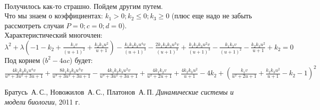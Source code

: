 \documentclass[oneside, final, 12pt]{article}
\begin{document}
\)\\

Получилось как-то страшно. Пойдем другим путем.\\

Что мы знаем о коэффициентах: \( k_1 > 0; k_2 \leq 0; k_3 \geq 0\) (плюс еще надо не забыть рассмотреть случаи \(P=0; c=0; d=0\)).\\

Характеристический многочлен:\\

\(
\lambda^{2}  + \lambda \left( -1 - k_{2} + \frac{k_{1}  v}{(u+1)^2} + \frac{k_{2} k_{3}  u^{2}}{u + 1} \right)  - \frac{k_{1} k_{2} k_{3} u^{4} v}{(u+1)^3} - \frac{2 k_{1} k_{2} k_{3} u^{3} v}{(u+1)^3} + \frac{k_{1} k_{2} k_{3} u^{2} v}{(u+1)^3} - \frac{k_{1} k_{2} v}{(u+1)^2}  - \frac{k_{2} k_{3} u^{2}}{u + 1} + k_{2} = 0
\)\\


Под корнем (\(b^2 - 4ac\)) будет:\\

\( \frac{4 k_{1} k_{2} k_{3} u^{4} v}{u^{3} + 3 u^{2} + 3 u + 1} + \frac{8 k_{1} k_{2} k_{3} u^{3} v}{u^{3} + 3 u^{2} + 3 u + 1} - \frac{4 k_{1} k_{2} k_{3} u^{2} v}{u^{3} + 3 u^{2} + 3 u + 1} + \frac{4 k_{1} k_{2} v}{u^{2} + 2 u + 1} + \frac{4 k_{2} k_{3} u^{2}}{u + 1} - 4 k_{2} + \left(\frac{k_{1} v}{u^{2} + 2 u + 1} + \frac{k_{2} k_{3} u^{2}}{u + 1} - k_{2} - 1\right)^{2}
\)\\



\newpage
\clearpage
\begin{thebibliography}{0}
	Братусь~А.\,С., Новожилов~А.\,С., Платонов~А.\,П. \label{Bratus_book}
	\emph{Динамические системы и модели биологии},
	2011 г.
\end{thebibliography}
\end{document}
